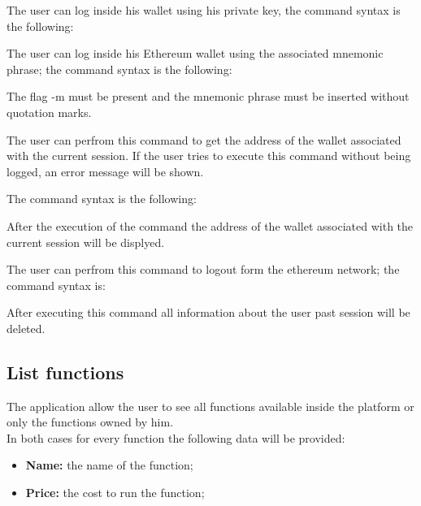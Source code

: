 The user can log inside his wallet using his private key, the command syntax is the following: \\
\begin{center}
\end{center}

The user can log inside his Ethereum wallet using the associated mnemonic phrase; the command syntax is the following: 

\begin{center}
\end{center}
The flag -m must be present and the mnemonic phrase must be inserted without quotation marks. 

The user can perfrom this command to get the address of the wallet associated with the current session. If the user tries to execute this command without being logged, an error message will be shown. 

The command syntax is the following: \\
\begin{center}
\end{center}
After the execution of the command the address of the wallet associated with the current session will be displyed.

The user can perfrom this command to logout form the ethereum network; the command syntax is: 
\begin{center}
\end{center}
After executing this command all information about the user past session will be deleted. 

\subsection{List functions}
The application allow the user to see all functions available inside the platform or only the functions owned by him. \\ 
\noindent In both cases for every function the following data will be provided: 
\begin{itemize}
	\item \textbf{Name: } the name of the function; 
	\item \textbf{Price: } the cost to run the function; 
\end{itemize}


